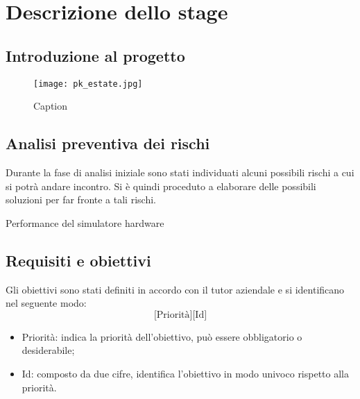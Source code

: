 
\chapter{Descrizione dello stage}
\label{cap:descrizione-stage}


\section{Introduzione al progetto}

\begin{figure}[!ht]
    \centering
    \texttt{[image: pk\_estate.jpg]}
    \caption{Caption}
\end{figure}
\lipsum[1]

\section{Analisi preventiva dei rischi}

Durante la fase di analisi iniziale sono stati individuati alcuni possibili
rischi a cui si potrà andare incontro. Si è quindi proceduto a elaborare delle
possibili soluzioni per far fronte a tali rischi.

\begin{risk}{Performance del simulatore hardware}
    \label{risk:hardware-simulator}
\end{risk}

\section{Requisiti e obiettivi}
Gli obiettivi sono stati definiti in accordo con il tutor aziendale e si
identificano nel seguente modo:
\[
    \text{[Priorità][Id]}
\]
\begin{itemize}
    \item Priorità: indica la priorità dell'obiettivo, può essere obbligatorio o
          desiderabile;
    \item Id: composto da due cifre, identifica l'obiettivo in modo univoco rispetto alla priorità.
\end{itemize}

